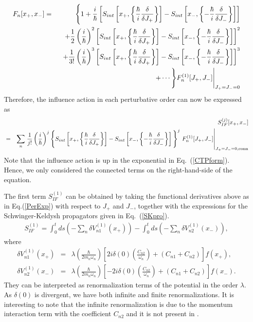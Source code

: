 \documentclass[%
amssymb,preprint,preprintnumbers,nofootinbib,superscriptaddress]{revtex4}
\begin{document}
\begin{eqnarray}
    F_{n}[x_{+},x_{-}]&=&\Bigg\{1+\frac{i}{\hbar}\left[S_{int}\left[x_{+},\left\{\frac{\hbar}{i}\frac{\delta}{\delta J_{+}}\right\}\right]-S_{int}\left[x_{-},\left\{-\frac{\hbar}{i}\frac{\delta}{\delta J_{-}}\right\}\right]\right]\nonumber\\
    &&\ \ +\frac{1}{2}\left(\frac{i}{\hbar}\right)^{2}\left[S_{int}\left[x_{+},\left\{\frac{\hbar}{i}\frac{\delta}{\delta J_{+}}\right\}\right]-S_{int}\left[x_{-},\left\{-\frac{\hbar}{i}\frac{\delta}{\delta J_{-}}\right\}\right]\right]^{2}\nonumber\\
     &&\ \ +\frac{1}{3!}\left(\frac{i}{\hbar}\right)^{3}\left[S_{int}\left[x_{+},\left\{\frac{\hbar}{i}\frac{\delta}{\delta J_{+}}\right\}\right]-S_{int}\left[x_{-},\left\{-\frac{\hbar}{i}\frac{\delta}{\delta J_{-}}\right\}\right]\right]^{3}\nonumber\\
    &&\left.\hskip 50pt +\cdots\Bigg\}F_{n}^{(1)}[J_{+},J_{-}]\right|_{J_{+}=J_{-}=0}
\end{eqnarray}
Therefore, the influence action in each perturbative order can now be expressed as
\begin{eqnarray}\label{PerExp}
    &&S_{IF}^{(j)}[x_{+},x_{-}]\nonumber\\
    &=&\sum_{n}\left.\frac{1}{j!}\left(\frac{i}{\hbar}\right)^{j}\Bigg\{S_{int}\left[x_{+},\left\{\frac{\hbar}{i}\frac{\delta}{\delta J_{+}}\right\}\right]-S_{int}\left[x_{-},\left\{-\frac{\hbar}{i}\frac{\delta}{\delta J_{-}}\right\}\right]\Bigg\}^{j}\ F_{n}^{(1)}[J_{+},J_{-}]\right|_{J_{+}=J_{-}=0,{\rm conn}}\nonumber\\
\end{eqnarray}
Note that the influence action is up in the exponential in Eq.~(\ref{CTPform}). Hence, we only considered the connected terms on the right-hand-side of the equation.



The first term $S_{IF}^{(1)}$ can be obtained by taking the functional derivatives above as in Eq.(\ref{PerExp}) with respect to $J_{+}$ and $J_{-}$, together with the expressions for the Schwinger-Keldysh propagators given in Eq.~(\ref{SKpro}).
\begin{eqnarray}
S_{IF}^{(1)}=\int_{0}^{t}ds\left(-\sum_{n}\delta V_{n1}^{(1)}(x_{+})\right)-\int_{0}^{t}ds\left(-\sum_{n}\delta V_{n2}^{(1)}(x_{-})\right),
\end{eqnarray}
where
\begin{eqnarray}
\delta V_{n1}^{(1)}(x_{+})&=&\lambda\left(\frac{\hbar}{2m_{n}\omega_{n}}\right)\left[2i\delta(0)\left(\frac{C_{n2}}{\omega_{n}}\right)+(C_{n1}+C_{n2})\right]f(x_{+}),\\
\delta V_{n2}^{(1)}(x_{-})&=&\lambda\left(\frac{\hbar}{2m_{n}\omega_{n}}\right)\left[-2i\delta(0)\left(\frac{C_{n2}}{\omega_{n}}\right)+(C_{n1}+C_{n2})\right]f(x_{-}).
\end{eqnarray}
They can be interpreted as renormalization terms of the potential in the order $\lambda$. As $\delta(0)$ is divergent, we have both infinite and finite renormalizations. It is interesting to note that the infinite renormalization is due to the momentum interaction term with the coefficient $C_{n2}$ and it is not present in \cite{HPZ93}.
\end{document}
